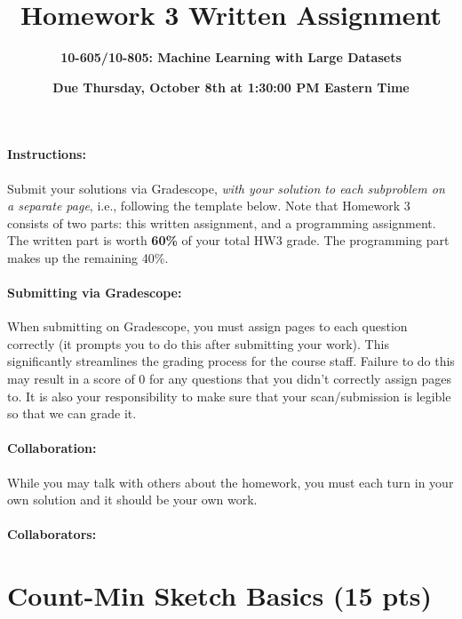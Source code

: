 \documentclass{exam}
\begin{document}
\title{Homework 3 Written Assignment}
\author{\Large \bf 10-605/10-805: Machine Learning with Large Datasets}
\date{{\bf Due Thursday, October 8th at 1:30:00 PM Eastern Time}}
\maketitle

\paragraph{Instructions:} Submit your solutions via Gradescope, \textit{with your solution to each subproblem on a separate page}, i.e., following the template below.  Note that Homework 3 consists of two parts: this written assignment, and a programming assignment. The written part is worth \textbf{60\%} of your total HW3 grade. The programming part makes up the remaining 40\%.

\paragraph{Submitting via Gradescope:} When submitting on Gradescope, you must assign pages to each question correctly (it
prompts you to do this after submitting your work). This significantly streamlines the
grading process for the course staff.  Failure to do this may result in a score of 0 for any questions
that you didn't correctly assign pages to. It is also your responsibility to make sure that your scan/submission is legible so that we can grade it.

\paragraph{Collaboration:}  While you may talk with others about the homework, you must each turn in your own solution and it should be your own work. 

\paragraph{Collaborators:}


\newpage



\section{Count-Min Sketch Basics (15 pts)} 
\end{document}
